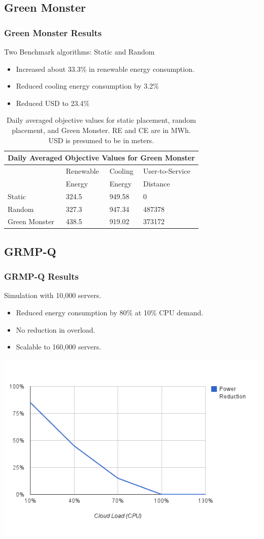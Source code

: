 \documentclass{beamer}
\begin{document}
\subsection{Green Monster}
\begin{frame}
	\frametitle{Green Monster Results}
	Two Benchmark algorithms: Static and Random
	\begin{itemize}
		\item Increased about 33.3\% in renewable energy consumption.
	\item Reduced cooling energy consumption by 3.2\%
	\item Reduced USD to 23.4\%	
	\end{itemize}

	
	\begin{table}[tb]
\begin{center}
\begin{tabular}{|l|l|l|l|}
    \hline
    \multicolumn{4}{|c|}{\textbf{Daily Averaged Objective Values for Green Monster}} \\
    \hline
    & Renewable &  Cooling & User-to-Service \\
    & Energy & Energy & Distance \\
    \hline
    Static & 324.5 & 949.58 & 0 \\
    Random & 327.3 & 947.34 & 487378\\
   	Green Monster & 438.5 & 919.02 & 373172\\
    \hline
\end{tabular}
\caption{Daily averaged objective values for static placement, random placement, and Green Monster. RE and CE are in MWh. USD is presumed to be in meters. }
\label{tab:GMV}
\end{center}
\end{table}
	
\end{frame}
\subsection{GRMP-Q}
\begin{frame}
	\frametitle{GRMP-Q Results}
	Simulation with 10,000 servers.
	\begin{itemize}
		\item Reduced energy consumption by 80\% at 10\% CPU demand.
		\item No reduction in overload.
		\item Scalable to 160,000 servers.
	\end{itemize}
	
	\includegraphics[width=.7\textwidth]{image.png}
	
\end{frame}
\end{document}
